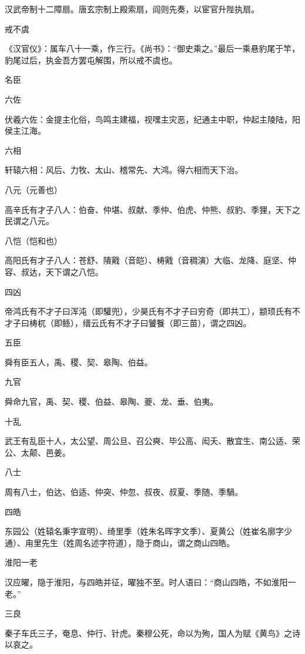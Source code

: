 \documentclass[a4paper,12pt,UTF8,twoside]{ctexbook}
\begin{document}
    汉武帝制十二障扇。唐玄宗制上殿索扇，阎则先奏，以宦官升陛执扇。
    
    戒不虞
    
    《汉官仪》：属车八十一乘，作三行。《尚书》：“御史乘之。”最后一乘悬豹尾于竿，豹尾过后，执金吾方罢屯解围，所以戒不虞也。
    
    名臣
    
    六佐
    
    伏羲六佐：金提主化俗，鸟鸣主建福，视嘿主灾恶，纪通主中职，仲起主陵陆，阳侯主江海。
    
    六相
    
    轩辕六相：风后、力牧、太山、稽常先、大鸿。得六相而天下治。
    
    八元（元善也）
    
    高辛氏有才子八人：伯奋、仲堪、叔献、季仲、伯虎、仲熊、叔豹、季狸，天下之民谓之八元。
    
    八恺（恺和也）
    
    高阳氏有才子八人：苍舒、隤戭（音皑）、梼戭（音稠演）大临、龙降、庭坚、仲容、叔达，天下谓之八恺。
    
    四凶
    
    帝鸿氏有不才子曰浑沌（即驩兜），少昊氏有不才子曰穷奇（即共工），颛顼氏有不才子曰梼杌（即鲧），缙云氏有不才子曰饕餮（即三苗），谓之四凶。
    
    五臣
    
    舜有臣五人，禹、稷、契、皋陶、伯益。
    
    九官
    
    舜命九官，禹、契、稷、伯益、皋陶、夔、龙、垂、伯夷。
    
    十乱
    
    武王有乱臣十人，太公望、周公旦、召公奭、毕公高、闳夭、散宜生、南公适、荣公、太颠、邑姜。
    
    八士
    
    周有八士，伯达、伯适、仲突、仲忽、叔夜、叔夏、季随、季騧。
    
    四皓
    
    东园公（姓辕名秉字宣明）、绮里季（姓朱名晖字文季）、夏黄公（姓崔名廓字少通）、甪里先生（姓周名述字符道），隐于商山，谓之商山四皓。
    
    淮阳一老
    
    汉应曜，隐于淮阳，与四皓并征，曜独不至。时人语曰：“商山四皓，不如淮阳一老。”
    
    三良
    
    秦子车氏三子，奄息、仲行、针虎。秦穆公死，命以为殉，国人为赋《黄鸟》之诗以哀之。
    
\end{document}
